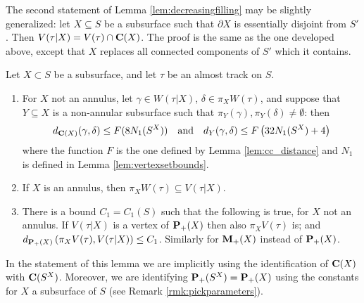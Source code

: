 The second statement of Lemma \ref{lem:decreasingfilling} may be slightly generalized: let $X\subseteq S$ be a subsurface such that $\partial X$ is essentially disjoint from $S'$. Then $V(\tau|X)=V(\tau)\cap\mathbf C(X)$. The proof is the same as the one developed above, except that $X$ replaces all connected components of $S'$ which it contains.

\begin{lemma}\label{lem:induction_vertices_commute}
Let $X\subset S$ be a subsurface, and let $\tau$ be an almost track on $S$.
\begin{enumerate}
\item For $X$ not an annulus, let $\gamma\in W(\tau|X)$, $\delta\in \pi_X W(\tau)$, and suppose that $Y\subseteq X$ is a non-annular subsurface such that $\pi_Y(\gamma),\pi_Y(\delta)\not=\emptyset$: then 
$$d_{\mathbf C(X)}(\gamma,\delta)\leq F(8 N_1(S^X))\quad\text{and}\quad d_Y(\gamma,\delta)\leq F\left(32 N_1(S^X) + 4\right)$$
where the function $F$ is the one defined by Lemma \ref{lem:cc_distance} and $N_1$ is defined in Lemma \ref{lem:vertexsetbounds}.
\item If $X$ is an annulus, then $\pi_X W(\tau)\subseteq V(\tau|X)$.
\item There is a bound $C_1=C_1(S)$ such that the following is true, for $X$ not an annulus. If $V(\tau|X)$ is a vertex of ${\mathbf{P}_+}(X)$ then also $\pi_X V(\tau)$ is; and\linebreak $d_{{\mathbf{P}_+}(X)}\left(\pi_X V(\tau),V(\tau|X)\right)\leq C_1$. Similarly for ${\mathbf{M}_+}(X)$ instead of ${\mathbf{P}_+}(X)$.
\end{enumerate}
\end{lemma}
In the statement of this lemma we are implicitly using the identification of $\mathbf C(X)$ with $\mathbf C(S^X)$. Moreover, we are identifying ${\mathbf{P}_+}(S^X)={\mathbf{P}_+}(X)$ using the constants for $X$ a subsurface of $S$ (see Remark \ref{rmk:pickparameters}).

